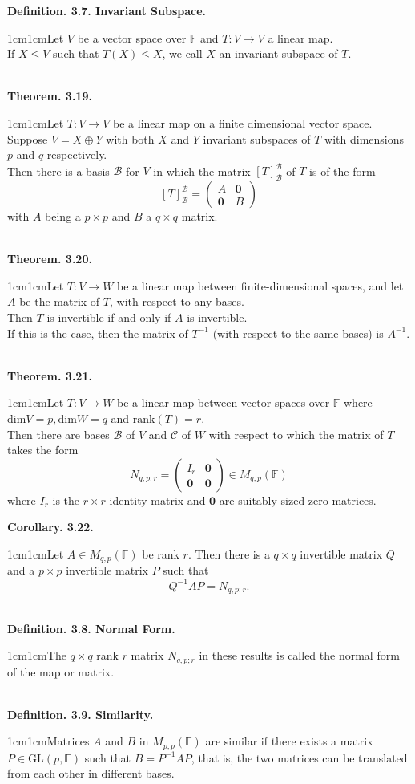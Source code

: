\documentclass{article}
\newcommand{\vect}[1]{\mathbf{#1}}
\newcommand{\definition}[2]{\textbf{Definition. #1.}\begin{adjustwidth}{1cm}{1cm}#2\end{adjustwidth}}
\newcommand{\theorem}[2]{\textbf{Theorem. #1.}\begin{adjustwidth}{1cm}{1cm}#2\end{adjustwidth}}
\newcommand{\corollary}[2]{\textbf{Corollary. #1.}\begin{adjustwidth}{1cm}{1cm}#2\end{adjustwidth}}
\begin{document}
\definition{3.7. Invariant Subspace}{Let $V$ be a vector space over $\mathbb{F}$ and $T: V \rightarrow V$ a linear map.\\If $X \leq V$ such that $T(X) \leq X$, we call $X$ an invariant subspace of $T$.}~\\
\theorem{3.19}{Let $T: V \rightarrow V$ be a linear map on a finite dimensional vector space. Suppose $V = X \oplus Y$ with both $X$ and $Y$ invariant subspaces of $T$ with dimensions $p$ and $q$ respectively.\\Then there is a basis $\mathcal{B}$ for $V$ in which the matrix $[T]^\mathcal{B}_\mathcal{B}$ of $T$ is of the form \[[T]^\mathcal{B}_\mathcal{B} = \begin{pmatrix} A & \vect{0} \\ \vect{0} & B \end{pmatrix}\]with $A$ being a $p \times p$ and $B$ a $q \times q$ matrix.}~\\
\theorem{3.20}{Let $T : V \rightarrow W$ be a linear map between finite-dimensional spaces, and let $A$ be the matrix of $T$, with respect to any bases.\\Then $T$ is invertible if and only if $A$ is invertible.\\If this is the case, then the matrix of $T^{-1}$ (with respect to the same bases) is $A^{-1}$.}~\\
\theorem{3.21}{Let $T: V \rightarrow W$ be a linear map between vector spaces over $\mathbb{F}$ where $\text{dim}V = p, \text{dim}W = q$ and $\text{rank}(T) = r$.\\Then there are bases $\mathcal{B}$ of $V$ and $\mathcal{C}$ of $W$ with respect to which the matrix of $T$ takes the form \[N_{q,p;r} = \begin{pmatrix} I_r & \vect{0} \\ \vect{0} & \vect{0} \end{pmatrix} \in M_{q,p} (\mathbb{F})\]where $I_r$ is the $r \times r$ identity matrix and $\vect{0}$ are suitably sized zero matrices.}\newpage
\corollary{3.22}{Let $A \in M_{q,p}(\mathbb{F})$ be rank $r$. Then there is a $q \times q$ invertible matrix $Q$ and a $p \times p$ invertible matrix $P$ such that \[Q^{-1}AP = N_{q,p;r}.\]}~\\
\definition{3.8. Normal Form}{The $q \times q$ rank $r$ matrix $N_{q,p;r}$ in these results is called the normal form of the map or matrix.}~\\
\definition{3.9. Similarity}{Matrices $A$ and $B$ in $M_{p,p}(\mathbb{F})$ are similar if there exists a matrix $P \in \text{GL}(p, \mathbb{F})$ such that $B = P^{-1}AP$, that is, the two matrices can be translated from each other in different bases.}~\\
\end{document}
